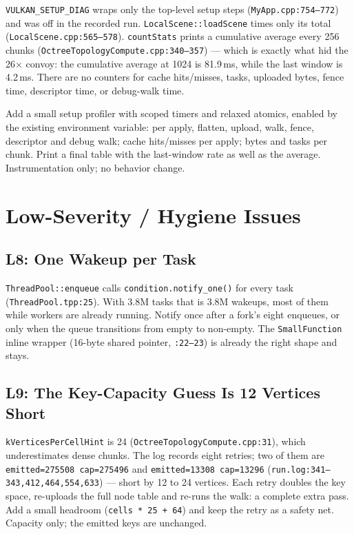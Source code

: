 \documentclass[11pt,a4paper]{article}
\begin{document}
\texttt{VULKAN\_SETUP\_DIAG} wraps only the top-level setup steps
(\texttt{MyApp.cpp:754--772}) and was off in the recorded run.
\texttt{LocalScene::loadScene} times only its total
(\texttt{LocalScene.cpp:565--578}). \texttt{countStats} prints a cumulative
average every 256 chunks (\texttt{OctreeTopologyCompute.cpp:340--357}) ---
which is exactly what hid the 26$\times$ convoy: the cumulative average at
1024 is 81.9\,ms, while the last window is 4.2\,ms. There are no counters for
cache hits/misses, tasks, uploaded bytes, fence time, descriptor time, or
debug-walk time.

Add a small setup profiler with scoped timers and relaxed atomics, enabled by
the existing environment variable: per apply, flatten, upload, walk, fence,
descriptor and debug walk; cache hits/misses per apply; bytes and tasks per
chunk. Print a final table with the last-window rate as well as the average.
Instrumentation only; no behavior change.

\section{Low-Severity / Hygiene Issues}

\subsection{L8: One Wakeup per Task}

\texttt{ThreadPool::enqueue} calls \texttt{condition.notify\_one()} for every
task (\texttt{ThreadPool.tpp:25}). With 3.8M tasks that is 3.8M wakeups,
most of them while workers are already running. Notify once after a fork's
eight enqueues, or only when the queue transitions from empty to non-empty.
The \texttt{SmallFunction} inline wrapper (16-byte shared pointer,
\texttt{:22--23}) is already the right shape and stays.

\subsection{L9: The Key-Capacity Guess Is 12 Vertices Short}

\texttt{kVerticesPerCellHint} is 24
(\texttt{OctreeTopologyCompute.cpp:31}), which underestimates dense chunks.
The log records eight retries; two of them are
\texttt{emitted=275508 cap=275496} and \texttt{emitted=13308 cap=13296}
(\texttt{run.log:341--343,412,464,554,633}) --- short by 12 to 24 vertices.
Each retry doubles the key space, re-uploads the full node table and re-runs
the walk: a complete extra pass. Add a small headroom
(\texttt{cells * 25 + 64}) and keep the retry as a safety net. Capacity only;
the emitted keys are unchanged.
\end{document}
